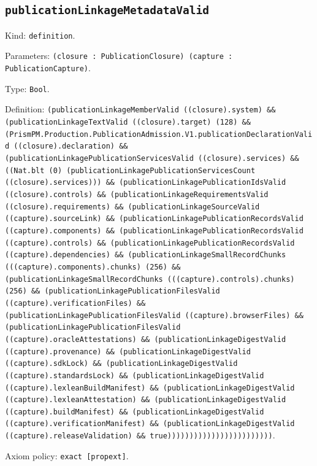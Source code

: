 \documentclass[11pt]{article}
\begin{document}
\subsection*{\texttt{publicationLinkageMetadataValid}}
\noindent Kind: \texttt{definition}.\par
\noindent Parameters: \texttt{(closure : PublicationClosure) (capture : PublicationCapture)}.\par
\noindent Type: \texttt{Bool}.\par
\noindent Definition: \texttt{(publicationLinkageMemberValid ((closure).system) \&\& (publicationLinkageTextValid ((closure).target) (128) \&\& (PrismPM.Production.PublicationAdmission.V1.publicationDeclarationValid ((closure).declaration) \&\& (publicationLinkagePublicationServicesValid ((closure).services) \&\& ((Nat.blt (0) (publicationLinkagePublicationServicesCount ((closure).services))) \&\& (publicationLinkagePublicationIdsValid ((closure).controls) \&\& (publicationLinkageRequirementsValid ((closure).requirements) \&\& (publicationLinkageSourceValid ((capture).sourceLink) \&\& (publicationLinkagePublicationRecordsValid ((capture).components) \&\& (publicationLinkagePublicationRecordsValid ((capture).controls) \&\& (publicationLinkagePublicationRecordsValid ((capture).dependencies) \&\& (publicationLinkageSmallRecordChunks (((capture).components).chunks) (256) \&\& (publicationLinkageSmallRecordChunks (((capture).controls).chunks) (256) \&\& (publicationLinkagePublicationFilesValid ((capture).verificationFiles) \&\& (publicationLinkagePublicationFilesValid ((capture).browserFiles) \&\& (publicationLinkagePublicationFilesValid ((capture).oracleAttestations) \&\& (publicationLinkageDigestValid ((capture).provenance) \&\& (publicationLinkageDigestValid ((capture).sdkLock) \&\& (publicationLinkageDigestValid ((capture).standardsLock) \&\& (publicationLinkageDigestValid ((capture).lexleanBuildManifest) \&\& (publicationLinkageDigestValid ((capture).lexleanAttestation) \&\& (publicationLinkageDigestValid ((capture).buildManifest) \&\& (publicationLinkageDigestValid ((capture).verificationManifest) \&\& (publicationLinkageDigestValid ((capture).releaseValidation) \&\& true))))))))))))))))))))))))}.\par
\noindent Axiom policy: \texttt{exact [propext]}.\par
\end{document}
